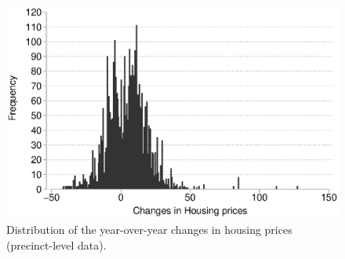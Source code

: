 \documentclass[12pt,a4paper]{article}
\begin{document}
				\begin{figure}
				\includegraphics[width=1\textwidth]{../figures/desplot.eps}
				\caption{Distribution of the year-over-year changes in housing prices (precinct-level data). }
				\label{desplot}
			\end{figure}
			
			
			\clearpage
			
			
			
			
\end{document}
